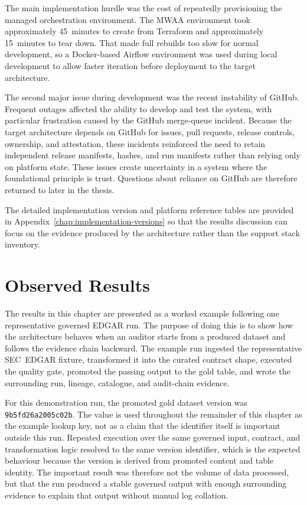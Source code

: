 The main implementation hurdle was the cost of repeatedly provisioning the
managed orchestration environment. The MWAA environment took approximately
45~minutes to create from Terraform and approximately 15~minutes to tear down.
That made full rebuilds too slow for normal development, so a Docker-based
Airflow environment was used during local development to allow faster
iteration before deployment to the target architecture.

The second major issue during development was the recent instability of
GitHub. Frequent outages affected the ability to develop and test the system,
with particular frustration caused by the GitHub merge-queue incident. Because
the target architecture depends on GitHub for issues, pull requests, release
controls, ownership, and attestation, these incidents reinforced the need to
retain independent release manifests, hashes, and run manifests rather than
relying only on platform state. These issues create uncertainty in a system
where the foundational principle is trust. Questions about reliance on GitHub
are therefore returned to later in the thesis.

The detailed implementation version and platform reference tables are provided
in Appendix~\ref{chap:implementation-versions} so that the results discussion
can focus on the evidence produced by the architecture rather than the support
stack inventory.

\section{Observed Results}
\noindent
The results in this chapter are presented as a worked example following one
representative governed EDGAR run. The purpose of doing this is to show how the
architecture behaves when an auditor starts from a produced dataset and follows
the evidence chain backward. The example run ingested the representative
SEC~EDGAR fixture, transformed it into the curated contract shape, executed the
quality gate, promoted the passing output to the gold table, and wrote the
surrounding run, lineage, catalogue, and audit-chain evidence.

For this demonstration run, the promoted gold dataset version was
\texttt{9b5fd26a2005c02b}. The value is used throughout the remainder of this
chapter as the example lookup key, not as a claim that the identifier itself is
important outside this run. Repeated execution over the same governed input,
contract, and transformation logic resolved to the same version identifier,
which is the expected behaviour because the version is derived from promoted
content and table identity. The important result was therefore not the volume
of data processed, but that the run produced a stable governed output with
enough surrounding evidence to explain that output without manual log
collation.

